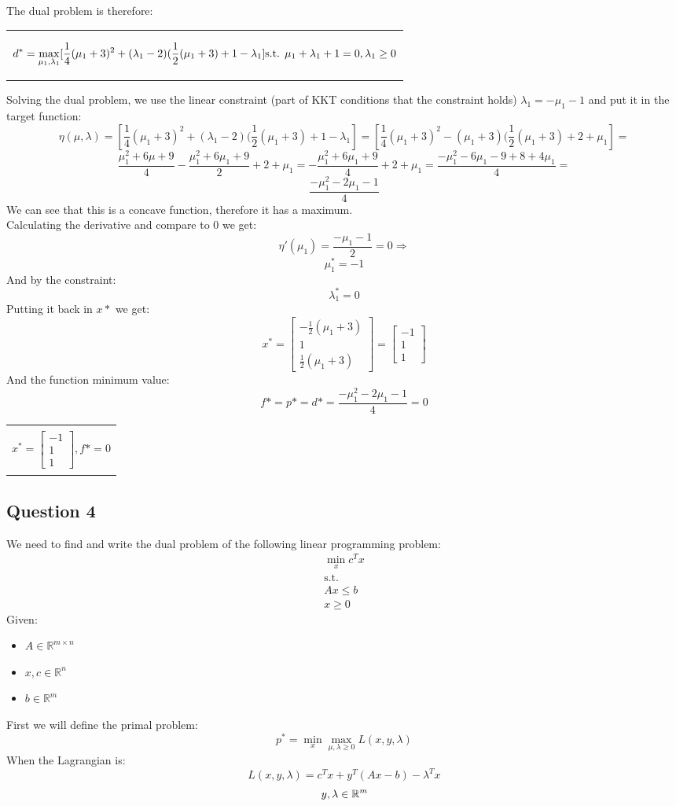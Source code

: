 \documentclass[12pt]{article}
\newcommand{\rectres}[1]{
\begin{center}
\begin{tabular}{ |c| }
\hline
\\
 #1\\
 \\
\hline
\end{tabular}
\end{center}
}
\begin{document}
The dual problem is therefore:
\rectres{
$$d^* =  \max _{\mu_1,\lambda_1} [ \frac{1}{4}(\mu_1 + 3)^2 + (\lambda_1-2) (\frac{1}{2}(\mu_1+3) + 1 - \lambda_1 ] \\ \text{s.t. } \mu_1 + \lambda_1 + 1 = 0, \lambda_1 \geq 0$$
}
Solving the dual problem, we use the linear constraint (part of KKT conditions that the constraint holds) $ \lambda_1 = - \mu_1 - 1$ and put it in the target function:
$$\eta(\mu,\lambda) = [ \frac{1}{4}(\mu_1 + 3)^2 + (\lambda_1-2) (\frac{1}{2}(\mu_1+3) + 1 - \lambda_1 ] = [ \frac{1}{4}(\mu_1 + 3)^2 - (\mu_1+3) (\frac{1}{2}(\mu_1+3) + 2 + \mu_1 ] = $$ $$\frac{\mu_1^2+6\mu + 9}{4} - \frac{\mu_1^2+6\mu_1 + 9}{2} + 2 + \mu_1 = - \frac{\mu_1^2+6\mu_1 + 9}{4} + 2 + \mu_1 =  \frac{-\mu_1^2 -6\mu_1 - 9 + 8 + 4\mu_1}{4}=$$
$$\frac{-\mu_1^2 -2\mu_1 - 1}{4}$$
We can see that this is a concave function, therefore it has a maximum.\\
Calculating the derivative and compare to 0 we get:
$$\eta'(\mu_1) = \frac{-\mu_1 -1}{2} = 0 \Rightarrow$$
$$\mu_1^* = -1$$
And by the constraint:
$$\lambda^*_1 = 0$$
Putting it back in $x*$ we get:\\
$$x^* = \begin{bmatrix}  -\frac{1}{2}(\mu_1+3) \\ 1 \\ \frac{1}{2}(\mu_1+3) \end{bmatrix} = \begin{bmatrix}  -1 \\ 1 \\ 1 \end{bmatrix}$$
And the function minimum value:
$$f*=p*=d*=\frac{-\mu_1^2 -2\mu_1 - 1}{4} = 0$$
\rectres{
$$x^* = \begin{bmatrix}  -1 \\ 1 \\ 1 \end{bmatrix}, f* = 0$$
}
\newpage
\subsection{Question 4}
We need to find and write the dual problem of the following linear programming problem:
\setcounter{equation}{0}
\begin{equation}
\label{eq:min4}
\begin{split}
    \min _x c^T x \\
    \text{s.t. }\\
    Ax \leq b\\
    x \geq 0
\end{split}
\end{equation}
Given:
\begin{itemize}
  \item $A \in \mathbb{R}^{m\times n}$
  \item $x,c \in \mathbb{R}^{n}$
  \item $b \in \mathbb{R}^{m}$
\end{itemize}
First we will define the primal problem:
$$p^*=\min_x \max_{\mu,\lambda \geq 0} L(x,y,\lambda)$$
When the Lagrangian is:
$$L(x,y,\lambda) = c^T x + y^T (Ax-b) -\lambda^T x$$
$$\\y,\lambda \in \mathbb{R}^m$$
\end{document}
